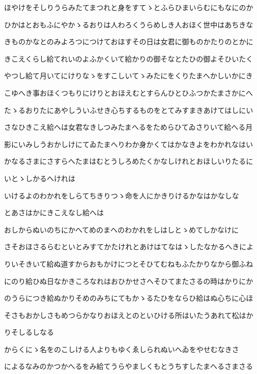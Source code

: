\documentclass[a4paper,11pt,landscape]{ltjtarticle}
\begin{document}
\par\medskip
ほやけをそしりうらみたてまつれと身をすてゝとふらひまいらむにもなにのか
\par\medskip
ひかはとおもふにやかゝるおりは人わろくうらめしき人おほく世中はあちきな
\par\medskip
きものかなとのみよろつにつけておほすその日は女君に御ものかたりのとかに
\par\medskip
きこえくらし給てれいのよふかくいて給かりの御そなとたひの御よそひいたく
\par\medskip
やつし給て月いてにけりなゝをすこしいてゝみたにをくりたまへかしいかにき
\par\medskip
こゆへき事おほくつもりにけりとおほえむとすらんひとひふつかたまさかにへ
\par\medskip
たゝるおりたにあやしういふせき心ちするものをとてみすまきあけてはしにい
\par\medskip
さなひきこえ給へは女君なきしつみたまへるをためらひてゐさりいて給へる月
\par\medskip
影にいみしうおかしけにてゐたまへりわか身かくてはかなきよをわかれなはい
\par\medskip
かなるさまにさすらへたまはむとうしろめたくかなしけれとおほしいりたるに
\par\medskip
いとゝしかるへけれは
\par\medskip
いけるよのわかれをしらてちきりつゝ命を人にかきりけるかなはかなしな
\par\medskip
とあさはかにきこえなし給へは
\par\medskip
おしからぬいのちにかへてめのまへのわかれをしはしとゝめてしかなけに
\par\medskip
さそおほさるらむといとみすてかたけれとあけはてなはゝしたなかるへきによ
\par\medskip
りいそきいて給ぬ道すからおもかけにつとそひてむねもふたかりなから御ふね
\par\medskip
にのり給ひぬ日なかきころなれはおひかせさへそひてまたさるの時はかりにか
\par\medskip
のうらにつき給ぬかりそめのみちにてもかゝるたひをならひ給はぬ心ちに心ほ
\par\medskip
そさもおかしさもめつらかなりおほえとのといひける所はいたうあれて松はか
\par\medskip
りそしるしなる
\par\medskip
からくにゝ名をのこしける人よりもゆくゑしられぬいへゐをやせむなきさ
\par\medskip
によるなみのかつかへるをみ給てうらやましくもとうちすしたまへるさまさる
\par\medskip
\end{document}
